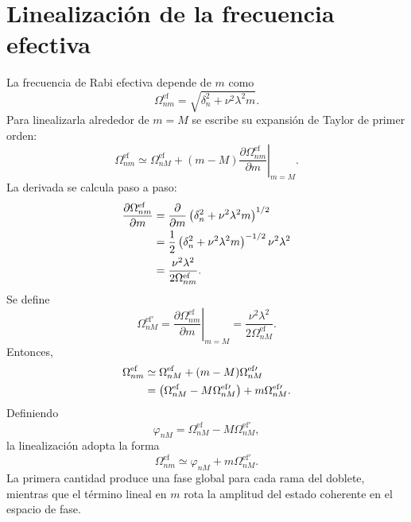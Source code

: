 \documentclass[11pt]{article}
\begin{document}
\section{Linealizaci\'on de la frecuencia efectiva}

La frecuencia de Rabi efectiva depende de $m$ como
\begin{equation}
  \Omega_{nm}^{\mathrm{ef}}
  =
  \sqrt{\delta_n^2+\nu^2\lambda^2m}.
\end{equation}
Para linealizarla alrededor de $m=M$ se escribe su expansi\'on de Taylor de
primer orden:
\begin{equation}
  \Omega_{nm}^{\mathrm{ef}}
  \simeq
  \Omega_{nM}^{\mathrm{ef}}
  +
  (m-M)
  \left.
  \frac{\partial\Omega_{nm}^{\mathrm{ef}}}{\partial m}
  \right|_{m=M}.
\end{equation}
La derivada se calcula paso a paso:
\begin{align}
  \frac{\partial\Omega_{nm}^{\mathrm{ef}}}{\partial m}
  &=
  \frac{\partial}{\partial m}
  \left(\delta_n^2+\nu^2\lambda^2m\right)^{1/2}
  \notag\\
  &=
  \frac12
  \left(\delta_n^2+\nu^2\lambda^2m\right)^{-1/2}
  \nu^2\lambda^2
  \notag\\
  &=
  \frac{\nu^2\lambda^2}
  {2\Omega_{nm}^{\mathrm{ef}}}.
\end{align}
Se define
\begin{equation}
  \boxed{
  \Omega_{nM}^{\mathrm{ef}\prime}
  =
  \left.
  \frac{\partial\Omega_{nm}^{\mathrm{ef}}}{\partial m}
  \right|_{m=M}
  =
  \frac{\nu^2\lambda^2}
  {2\Omega_{nM}^{\mathrm{ef}}}.
  }
\end{equation}
Entonces,
\begin{align}
  \Omega_{nm}^{\mathrm{ef}}
  &\simeq
  \Omega_{nM}^{\mathrm{ef}}
  +(m-M)\Omega_{nM}^{\mathrm{ef}\prime}
  \notag\\
  &=
  \left(
  \Omega_{nM}^{\mathrm{ef}}
  -
  M\Omega_{nM}^{\mathrm{ef}\prime}
  \right)
  +
  m\Omega_{nM}^{\mathrm{ef}\prime}.
\end{align}
Definiendo
\begin{equation}
  \boxed{
  \varphi_{nM}
  =
  \Omega_{nM}^{\mathrm{ef}}
  -
  M\Omega_{nM}^{\mathrm{ef}\prime},
  }
\end{equation}
la linealizaci\'on adopta la forma
\begin{equation}
  \boxed{
  \Omega_{nm}^{\mathrm{ef}}
  \simeq
  \varphi_{nM}
  +
  m\Omega_{nM}^{\mathrm{ef}\prime}.
  }
\end{equation}
La primera cantidad produce una fase global para cada rama del doblete,
mientras que el t\'ermino lineal en $m$ rota la amplitud del estado coherente
en el espacio de fase.
\end{document}
